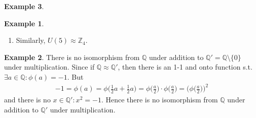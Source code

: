 \documentclass{article}
\theoremstyle{definition}
\newtheorem{example}{Example}[section]
\begin{document}
\begin{example}
\begin{example}
\begin{enumerate}
        Note that $\mathbb{Z_4}=\{1,2,3\},U(10)=\{1,3,7,9\}=\langle 3 \rangle$ and $|U(10)| = 4$. By Example 6.2, $U(10) \approx \mathbb{Z}_4$ under $\phi(3^k)=k \bmod 4$. First, assume that $\forall 3^i,3^j \in U(10), \phi(3^i) = \phi(3^j)$. Then
        \begin{align*}
            \phi(3^i) &= \phi(3^j), \\
            i \bmod 4 &= j \bmod 4, \\
            (i-j) \bmod 4 &= 0 \implies 4 \mid (i-j).
        \end{align*}
        By Theorem 4.1 (ii),
        \begin{equation*}
            |3| = 4 \implies (3^i=3^j \iff 4 \mid (i-j)).
        \end{equation*}
        Hence, 
        \begin{equation*}
            \forall 3^i,3^j \in U(10), \phi(3^i) = \phi(3^j) \implies 3^i=3^j.
        \end{equation*}
        Next, since
        \begin{align*}
            1 \in \mathbb{Z}_4, 1 &= \phi(3^1) = \phi(3^5) = \phi(3^{4k}), \\
            2 \in \mathbb{Z}_4, 2 &= \phi(3^{4k+2}), \\
            3 \in \mathbb{Z}_4, 3 &= \phi(3^{4k+3}),
        \end{align*}
        it follows that $\forall x \in \mathbb{Z}_4, \exists 3^k \in U(10): \phi(3^k) = x$. Finally,
        \begin{align*}
            \phi(3^i3^j) &= \phi(3^{i+j}) \\
            &= (i+j) \bmod 4 \\
            &= i \bmod 4 + j \bmod 4 \\
            &= \phi(3^i) + \phi(3^j).
        \end{align*}
        Hence, $U(10) \approx \mathbb{Z}_4$ under $\phi(3^k) = k \mod 4$.
        
        \item Similarly, $U(5) \approx \mathbb{Z}_4$.
    \end{enumerate}
    \end{example}
    
    \begin{example}
        There is no isomorphism from $\mathbb{Q}$ under addition to $\mathbb{Q}' = \mathbb{Q} \setminus \{0\}$ under multiplication. Since if $\mathbb{Q} \approx \mathbb{Q}'$, then there is an 1-1 and onto function s.t. $\exists a \in \mathbb{Q}: \phi(a)=-1$. But
        \begin{align*}
            -1 = \phi(a) = \phi\bigg(\frac{1}{2}a+\frac{1}{2}a\bigg) = \phi\bigg(\frac{a}{2}\bigg) \cdot \phi\bigg(\frac{a}{2}\bigg) = \bigg(\phi\bigg(\frac{a}{2}\bigg)\bigg)^2
        \end{align*}
        and there is no $x \in \mathbb{Q}': x^2 = -1$. Hence there is no isomorphism from $\mathbb{Q}$ under addition to $\mathbb{Q}'$ under multiplication.
    \end{example}
    

\end{example}
\end{document}
